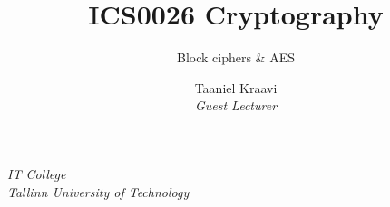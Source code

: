 

\usepackage{csquotes}

\usepackage{graphicx}
\graphicspath{ {../../images/} }

\usepackage{crysymb}

\usepackage{soul}

\usetikzlibrary{positioning,calc}
\graphicspath{ {../../images/} }

\title[Short version of title]{ICS0026 Cryptography}
\subtitle{Block ciphers \& AES}
\author%
{%
    {Taaniel Kraavi}\\
    \textit{\footnotesize Guest Lecturer}
}
\institute%
{%
    \textit{IT College}\\
    \textit{Tallinn University of Technology}
}


\begin{frame}
  \titlepage
\end{frame}

